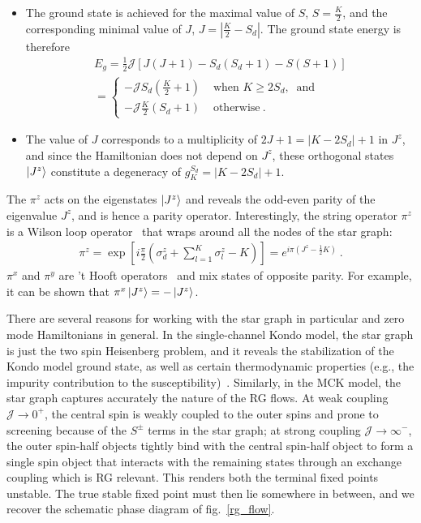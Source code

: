 \documentclass[reprint,prb,superscriptaddress]{revtex4-2}
\begin{document}
\begin{itemize}
	\item The ground state is achieved for the maximal value of \(S\), \(S=\frac{K}{2}\), and the corresponding minimal value of \(J\), \(J = |\frac{K}{2} - S_d|\). The ground state energy is therefore 
\begin{equation}\begin{aligned}
\label{ground-state-energy}
E_g = \frac{1}{2}\mathcal{J}\left[J(J+1) - S_d(S_d+1) - S(S+1)\right] \\
= \begin{cases}
	-\mathcal{J}S_d\left(\frac{K}{2} + 1\right) & \text{ when } K \geq 2S_d, ~\text{ and}\\
	-\mathcal{J}\frac{K}{2}\left(S_d + 1\right) & \text{ otherwise}~.
\end{cases}
\end{aligned}\end{equation}
	\item The value of \(J\) corresponds to a multiplicity of \(2J+1 = |K - 2S_d|+1\) in \(J^z\), and since the Hamiltonian does not depend on \(J^z\), these orthogonal states \(\ket{J^z}\) constitute a degeneracy of \(g^{S_d}_K = |K - 2S_d|+1\).
\end{itemize}
The \(\pi^z\) acts on the eigenstates \(\ket{J^z}\) and reveals the odd-even parity of the eigenvalue \(J^z\), and is hence a parity operator. Interestingly, {the string operator \(\pi^z\) is a Wilson loop operator~\cite{fradkin2013field} that wraps around all the nodes of the star graph}:
\begin{equation}\begin{aligned}
	\label{w_loop}
	\pi^z = \exp\left[i \frac{\pi}{2} \left(\sigma_d^z + \sum_{l=1}^K \sigma^z_l - K\right)\right] = e^{i \pi \left(J^z - \frac{1}{2}K\right)}~.
\end{aligned}\end{equation}
\(\pi^x\) and \(\pi^y\) are 't Hooft operators~\cite{fradkin2013field} and mix states of opposite parity. For example, it can be shown that \(\pi^x \ket{J^z} = -\ket{J^z}\).

There are several reasons for working with the star graph in particular and zero mode Hamiltonians in general.
In the single-channel Kondo model, the star graph is just the two spin Heisenberg problem, and it reveals the stabilization of the Kondo model ground state, as well as certain thermodynamic properties (e.g., the impurity contribution to the susceptibility)~\cite{varma_yafet_1976,yosida_1966,wilson1975renormalization,moca_zarand_2021,
varma_yafet_1976,kondo_urg}.
Similarly, in the MCK model, the star graph captures accurately the nature of the RG flows. At weak coupling \({\mathcal{J}} \to 0^+\), the central spin is weakly coupled to the outer spins and  prone to screening because of the \(S^\pm\) terms in the star graph; at strong coupling \({\mathcal{J}} \to \infty^-\), the outer spin-half objects tightly bind with the central spin-half object to form a single spin object that interacts with the remaining states through an exchange coupling which is RG relevant.
This renders both the terminal fixed points unstable.
The true stable fixed point must then lie somewhere in between, and we recover the schematic phase diagram of fig.~\ref{rg_flow}. 
\end{document}

